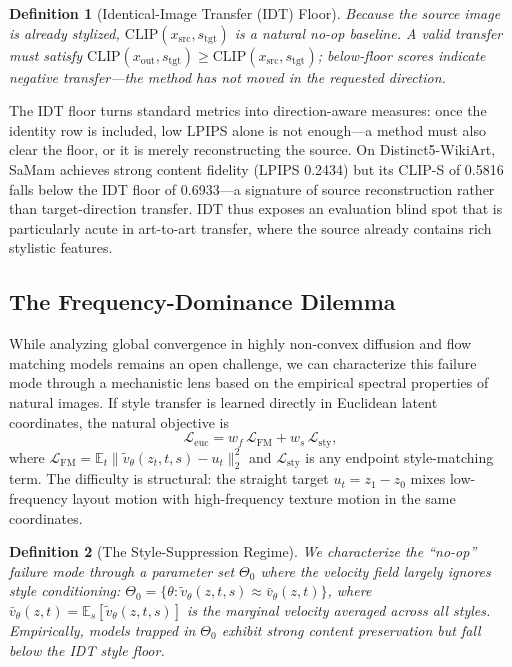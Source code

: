 \documentclass[letterpaper]{article}
\newtheorem{definition}{Definition}
\begin{document}
\begin{definition}[Identical-Image Transfer (IDT) Floor]
\label{def:idt}
Because the source image is already stylized, $\mathrm{CLIP}(x_{\mathrm{src}},s_{\mathrm{tgt}})$ is a natural no-op baseline. A valid transfer must satisfy $\mathrm{CLIP}(x_{\mathrm{out}},s_{\mathrm{tgt}})\ge \mathrm{CLIP}(x_{\mathrm{src}},s_{\mathrm{tgt}})$; below-floor scores indicate negative transfer---the method has not moved in the requested direction.
\end{definition}

The IDT floor turns standard metrics into direction-aware measures: once the identity row is included, low LPIPS alone is not enough---a method must also clear the floor, or it is merely reconstructing the source.
On Distinct5-WikiArt, SaMam achieves strong content fidelity (LPIPS 0.2434) but its CLIP-S of 0.5816 falls below the IDT floor of 0.6933---a signature of source reconstruction rather than target-direction transfer.
IDT thus exposes an evaluation blind spot that is particularly acute in art-to-art transfer, where the source already contains rich stylistic features.

\subsection{The Frequency-Dominance Dilemma}
\label{sec:attractor}

While analyzing global convergence in highly non-convex diffusion and flow matching models remains an open challenge, we can characterize this failure mode through a mechanistic lens based on the empirical spectral properties of natural images.
If style transfer is learned directly in Euclidean latent coordinates, the natural objective is
\begin{equation}
\mathcal L_{\mathrm{euc}} = w_f\,\mathcal L_{\mathrm{FM}} + w_s\,\mathcal L_{\mathrm{sty}},
\label{eq:euc}
\end{equation}
where $\mathcal L_{\mathrm{FM}} = \mathbb E_t\|\tilde v_\theta(z_t,t,s)-u_t\|_2^2$ and $\mathcal L_{\mathrm{sty}}$ is any endpoint style-matching term.
The difficulty is structural: the straight target $u_t=z_1-z_0$ mixes low-frequency layout motion with high-frequency texture motion in the same coordinates.

\begin{definition}[The Style-Suppression Regime]
\label{def:attractor}
We characterize the ``no-op'' failure mode through a parameter set $\Theta_0$ where the velocity field largely ignores style conditioning:
$\Theta_0 = \{\theta: \tilde v_\theta(z,t,s) \approx \bar v_\theta(z,t)\}$, where $\bar v_\theta(z,t) = \mathbb E_s[\tilde v_\theta(z,t,s)]$ is the marginal velocity averaged across all styles.
Empirically, models trapped in $\Theta_0$ exhibit strong content preservation but fall below the IDT style floor.
\end{definition}
\end{document}
